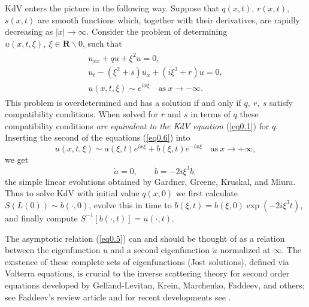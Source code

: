 \documentclass{surv-l}
\theoremstyle{plain}
\theoremstyle{definition}
\numberwithin{equation}{chapter}
\begin{document}
KdV enters the picture in the following way. Suppose that $q(x, t)$, $r(x, t)$, $s(x, t)$ are smooth functions which, together with their derivatives, are rapidly decreasing as $|x|\rightarrow\infty$. Consider the problem of determining $u(x, t, \xi),\ \xi\in \textbf{R}\backslash 0$, such that
\begin{align}\label{eq0.6}
\begin{array}{c}
u_{xx}+qu+\xi^{2}u=0,\\
u_{t}-(\xi^{2}+s)u_{x}+(i\xi^{3}+r)u=0,\\
u(x, t,\xi)\sim e^{ix\xi}\quad \mathrm{as}\ x\rightarrow-\infty.
\end{array}
\end{align}
This problem is overdetermined and has a solution if and only if $q,\ r,\ s$ satisfy compatibility conditions. When solved for $r$ and $s$ in terms of $q$ these compatibility conditions \emph{are equivalent to the KdV equation} (\ref{eq0.1}) for $q$. Inserting the second of the equations (\ref{eq0.6}) into
\setcounter{equation}{4}
\begin{equation}\label{eq0.6a}
u(x, t, \xi)\sim a(\xi,t)e^{ix\xi}+b(\xi, t)e^{-ix\xi}\quad \mathrm{as}\  x\rightarrow+\infty,
\end{equation}
we get
\setcounter{equation}{6}
\begin{equation}\label{eq0.7}
\dot{a}=0,\qquad\dot{b}=-2i\xi^{3}b,
\end{equation}
the simple linear evolutions obtained by Gardner, Greene, Kruskal, and Miura. Thus to solve KdV with initial value $q(x, 0)$ we first calculate $S(L(0))\sim b(\cdot,0)$, evolve this in time to $b(\xi,t) = b(\xi, 0)\exp(-2i\xi^{3}t)$, and finally compute $S^{-1}[b(\cdot,t)]=u(\cdot, t)$.

The asymptotic relation (\ref{eq0.5}) can and should be thought of as a relation between the eigenfunction $u$ and a second eigenfunction $\tilde{u}$ normalized at $\infty$. The existence of these complete sets of eigenfunctions (Jost solutions), defined via Volterra equations, is crucial to the inverse scattering theory for second order equations developed by Gelfand-Levitan, Krein, Marchenko, Faddeev, and others; see Faddeev's review article \cite{Fa2} and for recent developments see \cite{DT, Ma, Me}.
\end{document}
